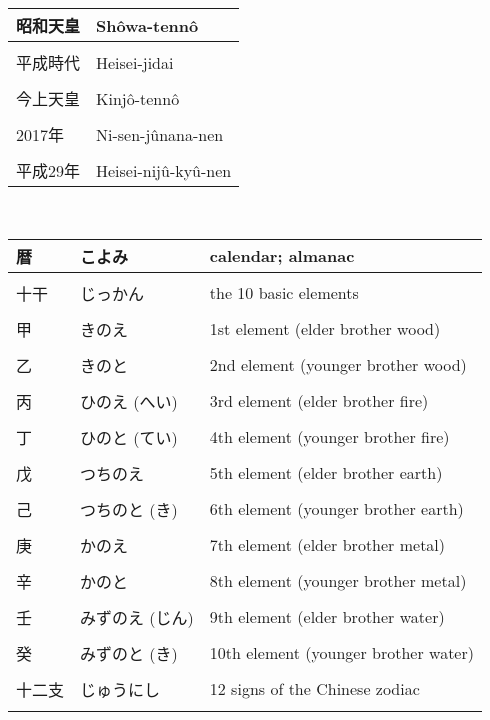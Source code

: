 \documentclass{article}
\begin{document}
\begin{tabular}{ l | p{10.5cm} }
昭和天皇 						&Shôwa-tennô	 \\ \hline \\[-1em]
平成時代 						&Heisei-jidai	 \\ \hline \\[-1em]
今上天皇 						&Kinjô-tennô	\\ \hline \\[-1em]
2017年 						&Ni-sen-jûnana-nen  \\ \hline \\[-1em]
平成29年 					&Heisei-nijû-kyû-nen			 \\[-1em]
\end{tabular} \\
\begin{tabular}{ l | l | p{10.5cm} }
暦		&こよみ		&calendar; almanac \\ \hline \\[-1em]
十干		&じっかん		&the 10 basic elements \\ \hline \\[-1em]
甲		&きのえ		&1st element (elder brother wood) \\ \hline \\[-1em]
乙		&きのと		&2nd element (younger brother wood)\\ \hline \\[-1em]
丙		&ひのえ (へい)		&3rd element (elder brother fire) \\ \hline \\[-1em]
丁		&ひのと (てい)		&4th element (younger brother fire) \\ \hline \\[-1em]
戊		&つちのえ		&5th element (elder brother earth) \\ \hline \\[-1em]
己		&つちのと (き)		&6th element (younger brother earth) \\ \hline \\[-1em]
庚		&かのえ		&7th element (elder brother metal) \\ \hline \\[-1em]
辛		&かのと		&8th element (younger brother metal) \\ \hline \\[-1em]
壬		&みずのえ (じん)	&9th element (elder brother water) \\ \hline \\[-1em]
癸		&みずのと (き)		&10th element (younger brother water) \\ \hline \\[-1em]
十二支		& じゅうにし 		&12 signs of the Chinese zodiac \\ \hline \\[-1em]

\end{tabular}
\end{document}
